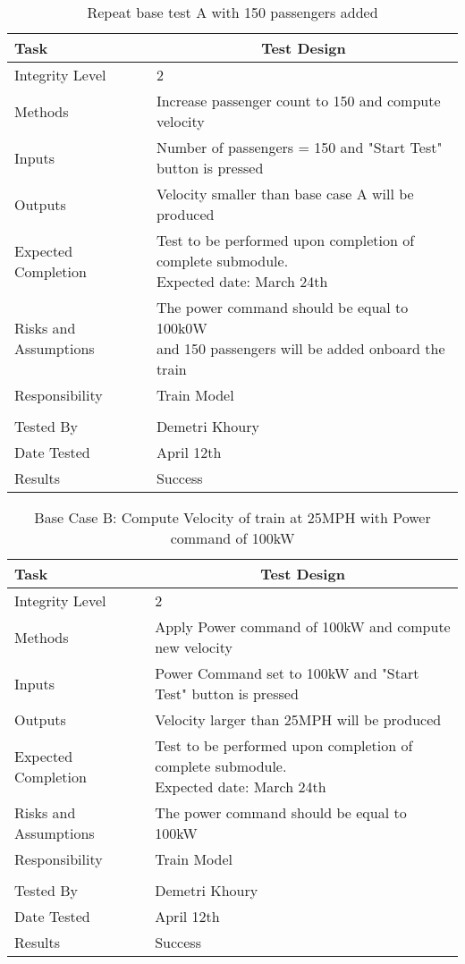 \documentclass[]{article}
\begin{document}
   	\begin{table}[H]
	   	\centering
	   	\caption{Repeat base test A with 150 passengers added}
	   	\begin{tabular}{|l|l|}
	   		\hline
	   		Task & \multicolumn{1}{c|}{Test Design} \\ \hline
	   		Integrity Level & 2 \\ \hline
	   		Methods & Increase passenger count to 150 and compute velocity  \\ \hline
	   		Inputs &  Number of passengers = 150 and "Start Test" button is pressed \\ \hline
	   		Outputs &  Velocity smaller than base case A will be produced  \\ \hline
	   		Expected Completion & \parbox[t]{10cm}{Test to be performed upon completion of complete submodule.\\ Expected date: March 24th}\\ \hline
	   		Risks and Assumptions & \parbox[t]{10cm}{The power command should be equal to 100k0W \\and 150 passengers will be added onboard the train} \\ \hline
	   		Responsibility & Train Model\\ \hline
	   		\\ \hline
	   		Tested By   &  Demetri Khoury\\	\hline
	   		Date Tested & \parbox[t]{10cm}{April 12th}\\ \hline
	   		Results & Success\\ \hline
	   	\end{tabular}
   \end{table}

	\begin{table}[H]
		\centering
		\caption{Base Case B: Compute Velocity of train at 25MPH with Power command of 100kW }
		\begin{tabular}{|l|l|}
			\hline
			Task & \multicolumn{1}{c|}{Test Design} \\ \hline
			Integrity Level & 2 \\ \hline
			Methods & Apply Power command of 100kW and compute new velocity  \\ \hline
			Inputs &  Power Command set to 100kW and "Start Test" button is pressed \\ \hline
			Outputs &  Velocity larger than 25MPH will be produced  \\ \hline
			Expected Completion & \parbox[t]{10cm}{Test to be performed upon completion of complete submodule.\\ Expected date: March 24th}\\ \hline
			Risks and Assumptions & The power command should be equal to 100kW \\ \hline
			Responsibility & Train Model\\ \hline
			\\ \hline
			Tested By   &  Demetri Khoury\\	\hline
			Date Tested & \parbox[t]{10cm}{April 12th}\\ \hline
			Results & Success\\ \hline
		\end{tabular}
	\end{table}
\end{document}

